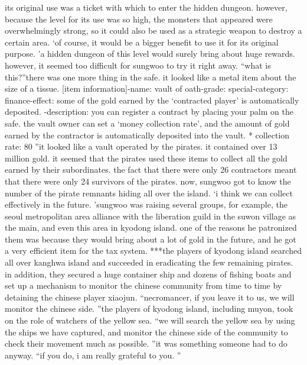  its original use was a ticket with which to enter the hidden dungeon.
however, because the level for its use was so high, the monsters that appeared were overwhelmingly strong, so it could also be used as a strategic weapon to destroy a certain area.
‘of course, it would be a bigger benefit to use it for its original purpose.
’a hidden dungeon of this level would surely bring about huge rewards.
 however, it seemed too difficult for sungwoo to try it right away.
“what is this?”there was one more thing in the safe.
 it looked like a metal item about the size of a tissue.
[item information]-name: vault of oath-grade: special-category: finance-effect: some of the gold earned by the ‘contracted player’ is automatically deposited.
-description: you can register a contract by placing your palm on the safe.
 the vault owner can set a ‘money collection rate’, and the amount of gold earned by the contractor is automatically deposited into the vault.
* collection rate: 80%
”it looked like a vault operated by the pirates.
 it contained over 13 million gold.
it seemed that the pirates used these items to collect all the gold earned by their subordinates.
the fact that there were only 26 contractors meant that there were only 24 survivors of the pirates.
 now, sungwoo got to know the number of the pirate remnants hiding all over the island.
‘i think we can collect effectively in the future.
’sungwoo was raising several groups, for example, the seoul metropolitan area alliance with the liberation guild in the suwon village as the main, and even this area in kyodong island.
one of the reasons he patronized them was because they would bring about a lot of gold in the future, and he got a very efficient item for the tax system.
***the players of kyodong island searched all over kanghwa island and succeeded in eradicating the few remaining pirates.
in addition, they secured a huge container ship and dozens of fishing boats and set up a mechanism to monitor the chinese community from time to time by detaining the chinese player xiaojun.
“necromancer, if you leave it to us, we will monitor the chinese side.
”the players of kyodong island, including muyon, took on the role of watchers of the yellow sea.
“we will search the yellow sea by using the ships we have captured, and monitor the chinese side of the community to check their movement much as possible.
”it was something someone had to do anyway.
“if you do, i am really grateful to you.
”

